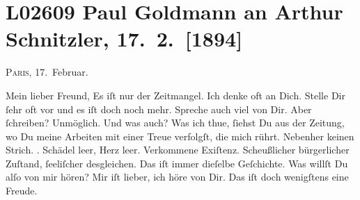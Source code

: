 

\section[Paul Goldmann an Arthur Schnitzler, 17. 2. {[}1894{]}]{L02609 Paul Goldmann an Arthur Schnitzler, 17. 2. {[}1894{]}}
\nopagebreak{}
\rehead{ }\normalsize\beginnumbering{}
\toendnotes[C]{\smallbreak\pagebreak[2]}
\toendnotes[C]{\smallbreak}
\toendnotes[C]{\smallbreak}
\pstart
           \raggedleft{}{\pb}\textsc{Paris}, 17. Februar.\pend
           
\pstart\center{}Mein lieber Freund,\pend\vspace{0.5em}
\pstart
           Es iſt nur der Zeitmangel. Ich denke oft an Dich. Stelle Dir{ }ſehr oft vor und es iſt
               doch noch mehr. Spreche auch viel von Dir. Aber{ }ſchreiben? Unmöglich. Und was auch?
               Was ich thue,{ }ſiehst Du aus der Zeitung, wo Du meine Arbeiten mit einer Treue verfolgſt, die mich rührt.
               Nebenher keinen Strich. \textsc{\label{K_L02609-1v}\label{K_L02609-1}}. Schädel leer, Herz leer. Verkommene Exiſtenz. Scheußlicher bürgerlicher
               Zuſtand,{ }ſeeliſcher desgleichen. {\pb}Das iſt immer
               dieſelbe Geſchichte. Was willſt Du alſo von mir hören? Mir iſt lieber, ich höre von
               Dir. Das iſt doch wenigſtens eine Freude.\pend
           
